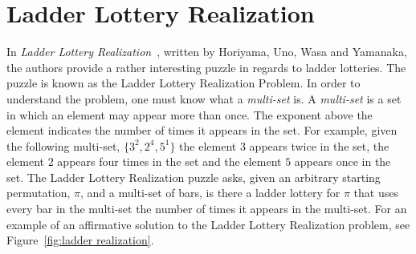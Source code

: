 

\section{Ladder Lottery Realization}

In \emph{Ladder Lottery Realization}~\cite{A3}, written by Horiyama, Uno, Wasa and Yamanaka, the authors provide 
a rather interesting puzzle in regards to ladder lotteries. The puzzle 
is known as the Ladder Lottery Realization Problem. In order to understand
the problem, one must know what a \emph{multi-set} is. A \emph{multi-set}
is a set in which an element may appear more than once. The exponent 
above the element indicates the number of times it appears in the set.
For example, given the following multi-set, $\{3^{2}, 2^{4}, 5^{1}\}$ 
the element $3$ appears twice in the set, the element $2$ appears four times
in the set and the element $5$ appears once in the set.
The Ladder Lottery Realization puzzle asks, given an arbitrary starting permutation, $\pi$, 
and a multi-set of bars, 
is there a ladder lottery for $\pi$
that uses every bar in the multi-set the number 
of times it appears in the  multi-set. 
For an example of an affirmative solution to the Ladder Lottery Realization problem, see Figure~\ref{fig:ladder realization}.

